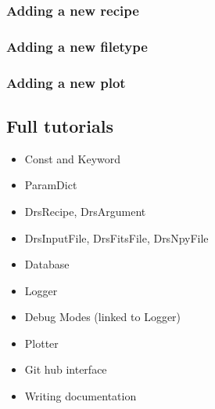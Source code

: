 \documentclass[a4paper,10pt,english]{report}
\begin{document}
\subsubsection{Adding a new recipe}
\label{\detokenize{dev/adding_new_recipe:adding-a-new-recipe}}\label{\detokenize{dev/adding_new_recipe:add-new-recipe}}\label{\detokenize{dev/adding_new_recipe::doc}}

\subsubsection{Adding a new filetype}
\label{\detokenize{dev/adding_new_filetype:adding-a-new-filetype}}\label{\detokenize{dev/adding_new_filetype:add-new-filetype}}\label{\detokenize{dev/adding_new_filetype::doc}}

\subsubsection{Adding a new plot}
\label{\detokenize{dev/adding_new_plot:adding-a-new-plot}}\label{\detokenize{dev/adding_new_plot:add-new-plot}}\label{\detokenize{dev/adding_new_plot::doc}}

\subsection{Full tutorials}
\label{\detokenize{dev/developer_guide:full-tutorials}}\label{\detokenize{dev/developer_guide:dev-main-full-tuts}}\begin{itemize}
\item {} 
Const and Keyword

\item {} 
ParamDict

\item {} 
DrsRecipe, DrsArgument

\item {} 
DrsInputFile, DrsFitsFile, DrsNpyFile

\item {} 
Database

\item {} 
Logger

\item {} 
Debug Modes (linked to Logger)

\item {} 
Plotter

\item {} 
Git hub interface

\item {} 
Writing documentation

\end{itemize}
\end{document}
